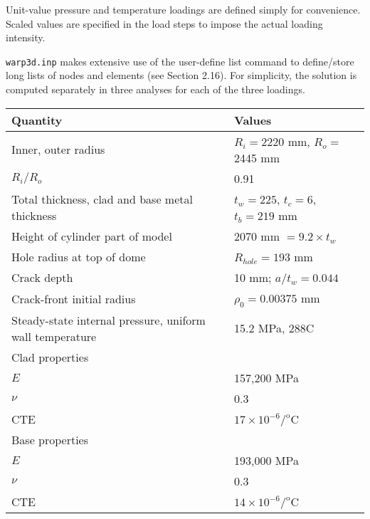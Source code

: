 \documentclass[11pt]{report}
\numberwithin{equation}{section}
\newcommand{\degree } {\mathrm{o} }  %
\newcommand{\ttt} {\texttt}  %
\begin{document}
Unit-value pressure and temperature loadings are defined simply for
convenience. Scaled values are specified in the load steps to
impose the actual loading intensity.

\ttt{warp3d.inp} makes extensive use of the user-define list command to define/store
long lists of nodes and elements (see Section 2.16).  For simplicity,
the solution is computed separately in three analyses for each of the three loadings.
%




\begin{table}[htb]	
\centering
{
\setlength{\extrarowheight}{2.5pt}
\small
\begin{tabular}{ | p{4in} | p{2in} | }
\hline
\textbf{Quantity} & \textbf{Values} \\
\hline \hline
Inner, outer radius & $R_i=2220$ mm, $R_o=$2445 mm \\ \hline
$R_i/R_o$ & 0.91 \\ \hline
Total thickness, clad and base metal thickness & $t_w=225$, $t_c=6$, $t_b=219$ mm  \\ \hline
Height of cylinder part of model&2070 mm $= 9.2 \times t_w$  \\ \hline
Hole radius at top of dome  & $R_{hole}=193$ mm  \\ \hline
Crack depth & 10 mm; $a/t_w=0.044$ \\ \hline
Crack-front initial radius & $\rho_0 = 0.00375$ mm \\ \hline
Steady-state internal pressure, uniform wall temperature  &  15.2 MPa, 288C  \\ \hline
Clad properties &   \\ \hline
\hspace{2em}$E$& 157,200 MPa\\ \hline
\hspace{2em}$\nu$ & 0.3 \\ \hline
\hspace{2em}CTE & $17 \times 10^{-6}/^\degree$C \\ \hline
Base properties &   \\ \hline
\hspace{2em}$E$&  193,000 MPa\\ \hline
\hspace{2em}$\nu$ & 0.3 \\ \hline
\hspace{2em}CTE & $14 \times 10^{-6}/^\degree$C \\ \hline

\end{tabular}}
\end{table}
\end{document}
